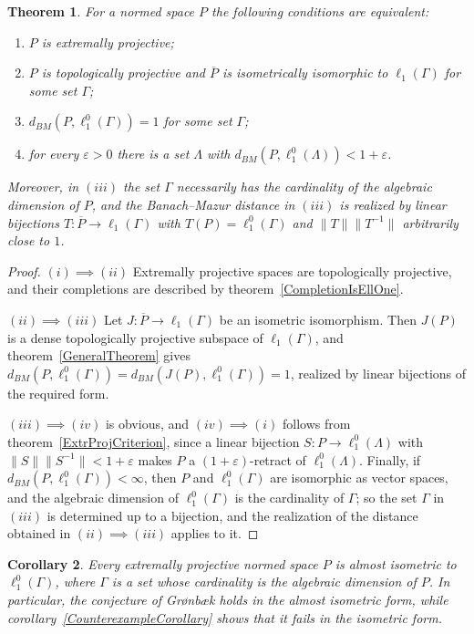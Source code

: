\documentclass[12pt]{article}
\newtheorem{theorem}{Theorem}[section]
\newtheorem{corollary}[theorem]{Corollary}
\newcommand{\lo}[1]{\ell_1^0(#1)}
\newcommand{\ellone}[1]{\ell_1(#1)}
\newcommand{\norm}[1]{\lVert #1\rVert}
\newcommand{\BM}{d_{BM}}
\begin{document}
\begin{theorem}\label{FinalCharacterization} For a normed space $P$ the
    following conditions are equivalent:
    \begin{enumerate}[label = (\roman*)]
        \item $P$ is extremally projective;
        \item $P$ is topologically projective and $\overline{P}$ is
              isometrically isomorphic to $\ellone{\Gamma}$ for some set
              $\Gamma$;
        \item $\BM(P,\lo{\Gamma})=1$ for some set $\Gamma$;
        \item for every $\varepsilon>0$ there is a set $\Lambda$ with
              $\BM(P,\lo{\Lambda})<1+\varepsilon$.
    \end{enumerate}
    Moreover, in $(iii)$ the set $\Gamma$ necessarily has the cardinality of
    the algebraic dimension of $P$, and the Banach--Mazur distance in
    $(iii)$ is realized by linear bijections
    $T:\overline{P}\to\ellone{\Gamma}$ with $T(P)=\lo{\Gamma}$ and
    $\norm{T}\norm{T^{-1}}$ arbitrarily close to $1$.
\end{theorem}
\begin{proof} $(i)\implies(ii)$ Extremally projective spaces are
    topologically projective, and their completions are described by
    theorem~\ref{CompletionIsEllOne}.

    $(ii)\implies(iii)$ Let $J:\overline{P}\to\ellone{\Gamma}$ be an isometric
    isomorphism. Then $J(P)$ is a dense topologically projective subspace of
    $\ellone{\Gamma}$, and theorem~\ref{GeneralTheorem} gives
    $\BM(P,\lo{\Gamma})=\BM(J(P),\lo{\Gamma})=1$, realized by linear
    bijections of the required form.

    $(iii)\implies(iv)$ is obvious, and $(iv)\implies(i)$ follows from
    theorem~\ref{ExtrProjCriterion}, since a linear bijection $S:P\to\lo{\Lambda}$
    with $\norm{S}\norm{S^{-1}}<1+\varepsilon$ makes $P$ a
    $(1+\varepsilon)$-retract of $\lo{\Lambda}$. Finally, if
    $\BM(P,\lo{\Gamma})<\infty$, then $P$ and $\lo{\Gamma}$ are isomorphic as
    vector spaces, and the algebraic dimension of $\lo{\Gamma}$ is the
    cardinality of $\Gamma$; so the set $\Gamma$ in $(iii)$ is determined up
    to a bijection, and the realization of the distance obtained in
    $(ii)\implies(iii)$ applies to it.
\end{proof}

\begin{corollary}\label{GronbaekConjecture} Every extremally projective
    normed space $P$ is almost isometric to $\lo{\Gamma}$, where $\Gamma$ is a
    set whose cardinality is the algebraic dimension of $P$. In particular,
    the conjecture of Gr{\o}nb{\ae}k \cite[conjecture 3.1]{GronLiftProbNormSp}
    holds in the almost isometric form, while corollary~\ref{CounterexampleCorollary}
    shows that it fails in the isometric form.
\end{corollary}
\end{document}

